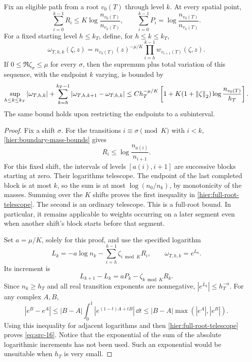 \begin{lemma}
\label{hier:weight-variation}
Fix an eligible path from a root $v_0(T)$ through level $k$.  At every
spatial point,
\begin{equation}
 \sum_{i=0}^{k-1}R_i
 \le K\log\frac{n_{v_0(T)}}{n_{v_k(T)}},
 \qquad
 \sum_{i=0}^{k-1}P_i
 =\log\frac{n_{v_0(T)}}{n_{v_k(T)}}.
 \label{hier:full-root-telescope}
\end{equation}
For a fixed starting level $h\le k_T$, define, for $h\le k\le k_T$,
\[
 \omega_{T,h,k}(\zeta,z)
 =n_{v_k(T)}(z)^{-\mu/K}
   \prod_{i=h}^{k-1}w_{v_{i+1}(T)}(\zeta,z).
\]
If $0\le\Re\zeta_\sigma\le\mu$ for every $\sigma$, then the supremum
plus total variation of this sequence, with the endpoint $k$ varying,
is bounded by
\begin{equation}
 \sup_{h\le k\le k_T}|\omega_{T,h,k}|
 +\sum_{k=h}^{k_T-1}
       |\omega_{T,h,k+1}-\omega_{T,h,k}|
 \le C h_T^{-\mu/K}
 \left[1+K(1+\left\|\zeta\right\|_2)
                   \log\frac{n_{v_0(T)}}{h_T}\right].
 \label{eq:src-16}
\end{equation}
The same bound holds upon restricting the endpoints to a subinterval.
\end{lemma}

\begin{proof}
Fix a shift $\sigma$.  For the transitions $i\equiv\sigma\pmod K$
with $i<k$, \eqref{hier:boundary-mass-bounds} gives
\[
 R_i\le\log\frac{n_{a(i)}}{n_{i+1}}.
\]
For this fixed shift, the intervals of levels $[a(i),i+1]$ are successive
blocks starting at zero.  Their logarithms telescope.  The endpoint of
the last completed block is at most $k$, so the sum is at most
$\log(n_0/n_k)$, by monotonicity of the masses.  Summing over the $K$
shifts proves the first inequality in
\eqref{hier:full-root-telescope}.  The second is an ordinary telescope.
This is a full-root bound.  In particular, it remains applicable to
weights occurring on a later segment even when another shift's block
starts before that segment.

Set $a=\mu/K$, solely for this proof, and use the specified logarithm
\[
 L_k=-a\log n_k-\sum_{i=h}^{k-1}\zeta_{i\bmod K}R_i,
 \qquad \omega_{T,h,k}=e^{L_k}.
\]
Its increment is
\begin{equation}
 L_{k+1}-L_k=aP_k-\zeta_{k\bmod K}R_k.
 \label{hier:log-weight-increment}
\end{equation}
Since $n_k\ge h_T$ and all real transition exponents are nonnegative,
$|e^{L_k}|\le h_T^{-a}$.  For any complex $A,B$,
\[
 |e^B-e^A|
 \le |B-A|\int_0^1|e^{(1-t)A+tB}|\,\dd t
 \le |B-A|\max(|e^A|,|e^B|).
\]
Using this inequality for adjacent logarithms and then
\eqref{hier:full-root-telescope} proves \eqref{eq:src-16}.  Notice that
the exponential of the sum of the absolute logarithmic increments has
not been used.  Such an exponential would be unsuitable when $h_T$ is
very small.
\end{proof}

